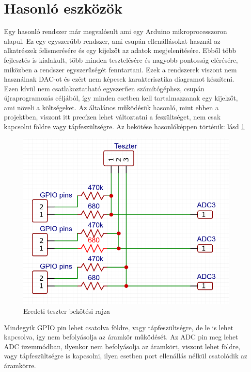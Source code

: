 \section{Hasonló eszközök}

Egy hasonló rendszer már megvalósult \cite{similarSystem} ami egy Arduino\cite{ArduinoAtmega} 
mikroprocesszoron alapul. Ez egy egyszerűbb rendszer, ami csupán ellenállásokat használ az 
alkatrészek felismerésére és egy kijelzőt az adatok megjelenítésére. Ebből több fejlesztés is 
kialakult, több minden tesztelésére és nagyobb pontosság elérésére, miközben a rendszer 
egyszerűségét fenntartani. Ezek a rendszerek viszont nem használnak DAC-ot és ezért nem képesek 
karakterisztika diagramot készíteni. Ezen kívül nem csatlakoztatható egyszerűen számítógéphez, 
csupán újraprogramozás céljából, így minden esetben kell tartalmazzanak egy kijelzőt, ami 
növeli a költségeket. Az általános működésük hasonló, mint ebben a projektben, viszont itt 
precízen lehet változtatni a feszültséget, nem csak kapcsolni földre vagy tápfeszültségre.
Az bekötése hasonlóképpen történik: lásd \ref{fig:basicTesterConnection}

\begin{figure}[h]
    \centering
    \includegraphics[scale=0.3]{figures/images/literature/OrgTesterConnection.png}
    \caption{Eredeti teszter bekötési rajza}
    \label{fig:basicTesterConnection}
\end{figure}

Mindegyik GPIO pin lehet csatolva földre, vagy tápfeszültségre, de le is lehet kapcsolva, így 
nem befolyásolja az áramkör működését. Az ADC pin meg lehet ADC üzemmódban, ilyenkor nem befolyásolja
az áramkört, viszont lehet földre, vagy tápfeszültségre is kapcsolni, ilyen esetben port ellenállás
nélkül csatolódik az áramkörre.

